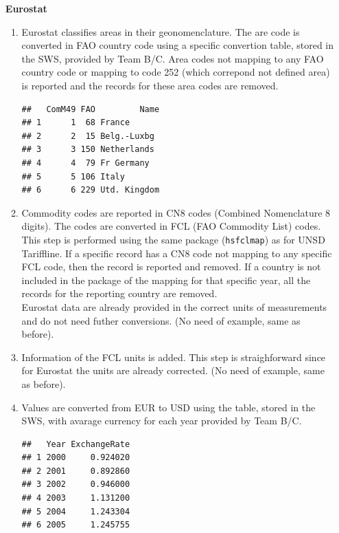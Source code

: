 \documentclass[nojss]{jss}\usepackage[]{graphicx}\usepackage[]{color}
\makeatletter
\newenvironment{kframe}{%
 \def\at@end@of@kframe{}%
 \ifinner\ifhmode%
  \def\at@end@of@kframe{\end{minipage}}%
  \begin{minipage}{\columnwidth}%
 \fi\fi%
 \def\FrameCommand##1{\hskip\@totalleftmargin \hskip-\fboxsep
 \colorbox{shadecolor}{##1}\hskip-\fboxsep
     \hskip-\linewidth \hskip-\@totalleftmargin \hskip\columnwidth}%
 \MakeFramed {\advance\hsize-\width
   \@totalleftmargin\z@ \linewidth\hsize
   \@setminipage}}%
 {\par\unskip\endMakeFramed%
 \at@end@of@kframe}
\newenvironment{knitrout}{}{} %
\makeatother
\begin{document}
\begin{itemize}
\item [\bf{Eurostat}]
\begin{enumerate}
\item Eurostat classifies areas in their geonomenclature. The are code is converted in FAO country code using a specific convertion  table, stored in the SWS, provided by Team B/C.  Area codes not mapping to any FAO country code or mapping to code 252 (which correpond not defined area) is reported and the records for these area codes are removed.
\begin{knitrout}
\color{fgcolor}\begin{kframe}
\begin{verbatim}
##   ComM49 FAO         Name
## 1      1  68 France      
## 2      2  15 Belg.-Luxbg 
## 3      3 150 Netherlands 
## 4      4  79 Fr Germany  
## 5      5 106 Italy       
## 6      6 229 Utd. Kingdom
\end{verbatim}
\end{kframe}
\end{knitrout}

\item Commodity codes are reported in CN8 codes (Combined Nomenclature 8 digits). The codes are converted in FCL (FAO Commodity List) codes. This step is performed using the same package ({\tt hsfclmap}) as for UNSD Tariffline.
If a specific record has a CN8 code not mapping to any specific FCL code, then the record is reported and removed. If a country is not included in the package of the mapping for that specific year, all the records for the reporting country are removed.\\
Eurostat data are already provided in the correct units of measurements and do not need futher conversions. (No need of example, same as before).
\item Information of the FCL units is added. This step is straighforward since for Eurostat the units are already corrected. (No need of example, same as before).
\item Values are converted from EUR to USD using the table, stored in the SWS, with avarage currency for each year provided by Team B/C.
\begin{knitrout}
\color{fgcolor}\begin{kframe}
\begin{verbatim}
##   Year ExchangeRate
## 1 2000     0.924020
## 2 2001     0.892860
## 3 2002     0.946000
## 4 2003     1.131200
## 5 2004     1.243304
## 6 2005     1.245755
\end{verbatim}
\end{kframe}
\end{knitrout}

\end{enumerate}
\end{itemize}
\end{document}
